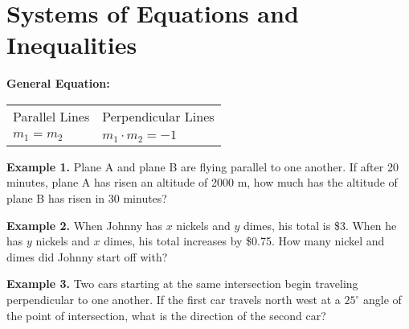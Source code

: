 \section{Systems of Equations and Inequalities}

\bigskip
\textbf{General Equation:} 

\bigskip
\begin{tabularx}{\textwidth}{*2{@{}>{\centering\arraybackslash}X}}
Parallel Lines & Perpendicular Lines\\
$m_1 = m_2$ & $m_1 \cdot m_2 = -1$
\end{tabularx}

\vfill
\textbf{Example 1.} Plane A and plane B are flying parallel to one another. If after 20 minutes, plane A has risen an altitude of 2000 m, how much has the altitude of plane B has risen in 30 minutes?

\vfill
\textbf{Example 2.} When Johnny has $x$ nickels and $y$ dimes, his total is \$3. When he has $y$ nickels and $x$ dimes, his total increases by \$0.75. How many nickel and dimes did Johnny start off with?

\vfill
\textbf{Example 3.} Two cars starting at the same intersection begin traveling perpendicular to one another. If the first car travels north west at a $25^\circ$ angle of the point of intersection, what is the direction of the second car?

